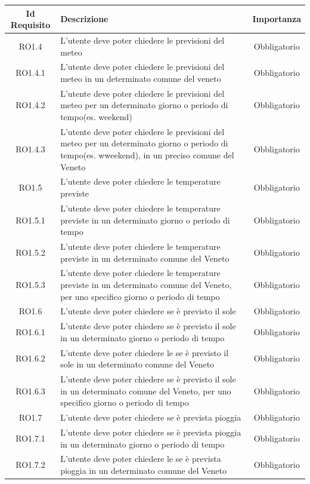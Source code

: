 \normalsize
\begin{longtable}{|c|>{\centering}m{7cm}|c|}
\hline
\textbf{Id Requisito} & \textbf{Descrizione} & \textbf{Importanza}\\
\hline
\endhead
RO1.4 & L'utente deve poter chiedere le previsioni del meteo & Obbligatorio\\ 
RO1.4.1 & L'utente deve poter chiedere le previsioni del meteo in un determinato comune del veneto & Obbligatorio\\
RO1.4.2 & L'utente deve poter chiedere le previsioni del meteo per un determinato giorno o periodo di tempo(es. weekend) & Obbligatorio\\  
RO1.4.3 & L'utente deve poter chiedere le previsioni del meteo per un determinato giorno o periodo di tempo(es. wweekend), in un preciso comune del Veneto & Obbligatorio\\ 
RO1.5 & L'utente deve poter chiedere le temperature previste & Obbligatorio\\ 
RO1.5.1 & L'utente deve poter chiedere le temperature previste in un determinato giorno o periodo di tempo & Obbligatorio\\
RO1.5.2 & L'utente deve poter chiedere le temperature previste in un determinato comune del Veneto & Obbligatorio\\  
RO1.5.3 & L'utente deve poter chiedere le temperature previste in un determinato comune del Veneto, per uno specifico giorno o periodo di tempo & Obbligatorio\\ 
RO1.6 & L'utente deve poter chiedere se è previsto il sole & Obbligatorio\\ 
RO1.6.1 & L'utente deve poter chiedere se è previsto il sole in un determinato giorno o periodo di tempo & Obbligatorio\\
RO1.6.2 & L'utente deve poter chiedere le se è previsto il sole in un determinato comune del Veneto & Obbligatorio\\  
RO1.6.3 & L'utente deve poter chiedere se è previsto il sole in un determinato comune del Veneto, per uno specifico giorno o periodo di tempo & Obbligatorio\\  
RO1.7 & L'utente deve poter chiedere se è prevista pioggia & Obbligatorio\\ 
RO1.7.1 & L'utente deve poter chiedere se è prevista pioggia in un determinato giorno o periodo di tempo & Obbligatorio\\
RO1.7.2 & L'utente deve poter chiedere le se è prevista pioggia in un determinato comune del Veneto & Obbligatorio\\  

\end{longtable}
